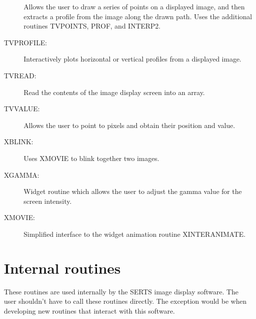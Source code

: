 \begin{description}
Allows the user to draw a series of points on a displayed image, and then
extracts a profile from the image along the drawn path.  Uses the additional
routines TVPOINTS, PROF, and INTERP2.
\item[TVPROFILE:]
Interactively plots horizontal or vertical profiles from a displayed image.
\item[TVREAD:]
Read the contents of the image display screen into an array.
\item[TVVALUE:]
Allows the user to point to pixels and obtain their position and value.
\item[XBLINK:]
Uses XMOVIE to blink together two images.
\item[XGAMMA:]
Widget routine which allows the user to adjust the gamma value for the screen
intensity.
\item[XMOVIE:]
Simplified interface to the widget animation routine XINTERANIMATE.
\end{description}

\section{Internal routines}

These routines are used internally by the SERTS image display software.  The
user shouldn't have to call these routines directly.  The exception would be
when developing new routines that interact with this software.


